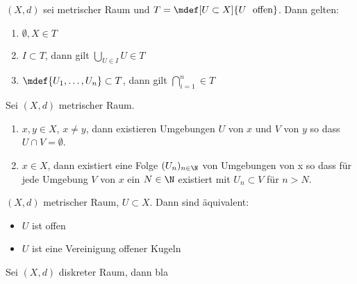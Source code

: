 \begin{stz}
    $(X,d)$ sei metrischer Raum und $T = \mdef[U\subset X]{U\ \text{ offen}}$.
    Dann gelten:
    \begin{enumerate}
        \item $\emptyset, X \in T$
        \item $I \subset T$, dann gilt $\bigcup_{U\in I} U \in T$
        \item $\mdef{U_1, \ldots, U_n} \subset T$, dann gilt
              $\bigcap_{i=1}^n \in T$
    \end{enumerate}
\end{stz}

\begin{stz}
    Sei $(X, d)$ metrischer Raum.
    \begin{enumerate}
        \item $x,y \in X$, $x \ne y$, dann existieren Umgebungen $U$ von $x$ und $V$
              von $y$ so dass $U \cap V = \emptyset$.
        \item $x \in X$, dann existiert eine Folge $(U_n)_{n\in \N}$ von Umgebungen
            von x so dass für jede Umgebung $V$ von $x$ ein $N\in\N$ existiert mit
            $U_n \subset V$ für $n > N$.
    \end{enumerate}
\end{stz}

\begin{stz}
    $(X, d)$ metrischer Raum, $U \subset X$. Dann sind äquivalent:
    \begin{itemize}
        \item $U$ ist offen
        \item $U$ ist eine Vereinigung offener Kugeln
    \end{itemize}
\begin{bem}
    Sei $(X, d)$ diskreter Raum, dann bla
\end{bem}
\end{stz}

